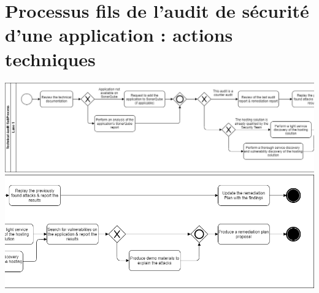 \section{Processus fils de l’audit de sécurité d’une application : actions techniques}
\label{appendix:subprocessaudit}
\vspace{2em}
\centering
\includegraphics[width=\textwidth]{resources/img/technical_audit_subprocess_pt1.png}
\includegraphics[width=\textwidth]{resources/img/technical_audit_subprocess_pt2.png}